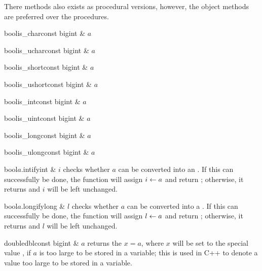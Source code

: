 There methods also exists as procedural versions, however, the object methods are preferred over
the procedures.
\begin{fcode}{bool}{is_char}{const bigint & $a$}\end{fcode}
\begin{fcode}{bool}{is_uchar}{const bigint & $a$}\end{fcode}
\begin{fcode}{bool}{is_short}{const bigint & $a$}\end{fcode}
\begin{fcode}{bool}{is_ushort}{const bigint & $a$}\end{fcode}
\begin{fcode}{bool}{is_int}{const bigint & $a$}\end{fcode}
\begin{fcode}{bool}{is_uint}{const bigint & $a$}\end{fcode}
\begin{fcode}{bool}{is_long}{const bigint & $a$}\end{fcode}
\begin{fcode}{bool}{is_ulong}{const bigint & $a$}\end{fcode}


\begin{cfcode}{bool}{$a$.intify}{int & $i$}
  checks whether $a$ can be converted into an .  If this can successfully be done, the
  function will assign $i \leftarrow a$ and return \FALSE; otherwise, it returns \TRUE and $i$ will
  be left unchanged.
\end{cfcode}

\begin{cfcode}{bool}{$a$.longify}{long & $l$}
  checks whether $a$ can be converted into a .  If this can successfully be done, the
  function will assign $l \leftarrow a$ and return \FALSE; otherwise, it returns \TRUE and $l$ will
  be left unchanged.
\end{cfcode}

\begin{fcode}{double}{dbl}{const bigint & $a$}
  returns the  $x = a$, where $x$ will be set to the special value ,
  if $a$ is too large to be stored in a  variable; this is used in C++ to denote a
  value too large to be stored in a  variable.
\end{fcode}



